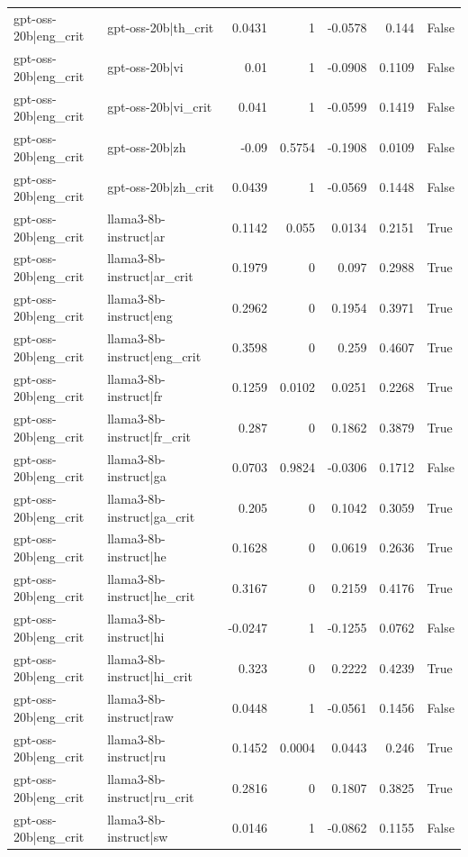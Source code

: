 \begin{table}
\begin{tabular}{l l r r r r l}
gpt-oss-20b|eng_crit & gpt-oss-20b|th_crit & 0.0431 & 1 & -0.0578 & 0.144 & False \\
gpt-oss-20b|eng_crit & gpt-oss-20b|vi & 0.01 & 1 & -0.0908 & 0.1109 & False \\
gpt-oss-20b|eng_crit & gpt-oss-20b|vi_crit & 0.041 & 1 & -0.0599 & 0.1419 & False \\
gpt-oss-20b|eng_crit & gpt-oss-20b|zh & -0.09 & 0.5754 & -0.1908 & 0.0109 & False \\
gpt-oss-20b|eng_crit & gpt-oss-20b|zh_crit & 0.0439 & 1 & -0.0569 & 0.1448 & False \\
gpt-oss-20b|eng_crit & llama3-8b-instruct|ar & 0.1142 & 0.055 & 0.0134 & 0.2151 & True \\
gpt-oss-20b|eng_crit & llama3-8b-instruct|ar_crit & 0.1979 & 0 & 0.097 & 0.2988 & True \\
gpt-oss-20b|eng_crit & llama3-8b-instruct|eng & 0.2962 & 0 & 0.1954 & 0.3971 & True \\
gpt-oss-20b|eng_crit & llama3-8b-instruct|eng_crit & 0.3598 & 0 & 0.259 & 0.4607 & True \\
gpt-oss-20b|eng_crit & llama3-8b-instruct|fr & 0.1259 & 0.0102 & 0.0251 & 0.2268 & True \\
gpt-oss-20b|eng_crit & llama3-8b-instruct|fr_crit & 0.287 & 0 & 0.1862 & 0.3879 & True \\
gpt-oss-20b|eng_crit & llama3-8b-instruct|ga & 0.0703 & 0.9824 & -0.0306 & 0.1712 & False \\
gpt-oss-20b|eng_crit & llama3-8b-instruct|ga_crit & 0.205 & 0 & 0.1042 & 0.3059 & True \\
gpt-oss-20b|eng_crit & llama3-8b-instruct|he & 0.1628 & 0 & 0.0619 & 0.2636 & True \\
gpt-oss-20b|eng_crit & llama3-8b-instruct|he_crit & 0.3167 & 0 & 0.2159 & 0.4176 & True \\
gpt-oss-20b|eng_crit & llama3-8b-instruct|hi & -0.0247 & 1 & -0.1255 & 0.0762 & False \\
gpt-oss-20b|eng_crit & llama3-8b-instruct|hi_crit & 0.323 & 0 & 0.2222 & 0.4239 & True \\
gpt-oss-20b|eng_crit & llama3-8b-instruct|raw & 0.0448 & 1 & -0.0561 & 0.1456 & False \\
gpt-oss-20b|eng_crit & llama3-8b-instruct|ru & 0.1452 & 0.0004 & 0.0443 & 0.246 & True \\
gpt-oss-20b|eng_crit & llama3-8b-instruct|ru_crit & 0.2816 & 0 & 0.1807 & 0.3825 & True \\
gpt-oss-20b|eng_crit & llama3-8b-instruct|sw & 0.0146 & 1 & -0.0862 & 0.1155 & False \\

\end{tabular}
\end{table}

